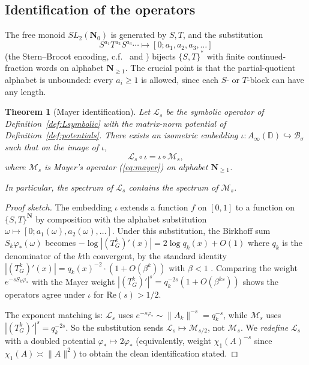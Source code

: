 ﻿\documentclass[11pt]{article}
\newtheorem{theorem}{Theorem}[section]
\theoremstyle{definition}
\newcommand{\N}{\mathbf{N}}
\newcommand{\Nz}{\mathbf{N}_0}
\newcommand{\SLNz}{SL_2(\Nz)}
\newcommand{\Lop}{\mathcal{L}}
\begin{document}
\subsection{Identification of the operators}

The free monoid $\SLNz$ is generated by $S,T$, and the substitution
\[
S^{a_1}T^{a_2}S^{a_3}\cdots \mapsto [0;a_1,a_2,a_3,\dots]
\]
(the Stern--Brocot encoding, c.f.\ \cite[\S5]{shakov2024} and \cite[\S2]{stern-brocot}) bijects $\{S,T\}^*$ with finite continued-fraction words on alphabet $\N_{\ge 1}$. The crucial point is that the partial-quotient alphabet is unbounded: every $a_i\ge 1$ is allowed, since each $S$- or $T$-block can have any length.

\begin{theorem}[Mayer identification]\label{thm:identification}
Let $\Lop_s$ be the symbolic operator of Definition~\ref{def:Lsymbolic} with the matrix-norm potential of Definition~\ref{def:potentials}. There exists an isometric embedding $\iota:A_\infty(\mathbb{D})\hookrightarrow\mathcal{B}_\sigma$ such that on the image of $\iota$,
\[
\Lop_{s} \circ \iota = \iota\circ \mathcal{M}_{s},
\]
where $\mathcal{M}_s$ is Mayer's operator (\ref{eq:mayer}) on alphabet $\N_{\ge 1}$.

In particular, the spectrum of $\Lop_s$ contains the spectrum of $\mathcal{M}_s$.
\end{theorem}

\begin{proof}[Proof sketch]
The embedding $\iota$ extends a function $f$ on $[0,1]$ to a function on $\{S,T\}^\N$ by composition with the alphabet substitution $\omega\mapsto[0;a_1(\omega),a_2(\omega),\dots]$. Under this substitution, the Birkhoff sum $S_k\varphi_*(\omega)$ becomes $-\log|(T_G^k)'(x)|=2\log q_k(x)+O(1)$ where $q_k$ is the denominator of the $k$th convergent, by the standard identity $|(T_G^k)'(x)|=q_k(x)^{-2}\cdot(1+O(\beta^k))$ with $\beta<1$ \cite[\S1.2]{khinchin}. Comparing the weight $e^{-sS_k\varphi_*}$ with the Mayer weight $|(T_G^k)'|^s = q_k^{-2s}(1+O(\beta^{ks}))$ shows the operators agree under $\iota$ for $\mathrm{Re}(s)>1/2$.

The exponent matching is: $\Lop_s$ uses $e^{-s\varphi_*}\sim\|A_k\|^{-s}=q_k^{-s}$, while $\mathcal{M}_s$ uses $|(T_G^k)'|^s=q_k^{-2s}$. So the substitution sends $\Lop_s\mapsto\mathcal{M}_{s/2}$, not $\mathcal{M}_s$. We \emph{redefine} $\Lop_s$ with a doubled potential $\varphi_*\mapsto 2\varphi_*$ (equivalently, weight $\chi_1(A)^{-s}$ since $\chi_1(A)\asymp\|A\|^2$) to obtain the clean identification stated.
\end{proof}
\end{document}
